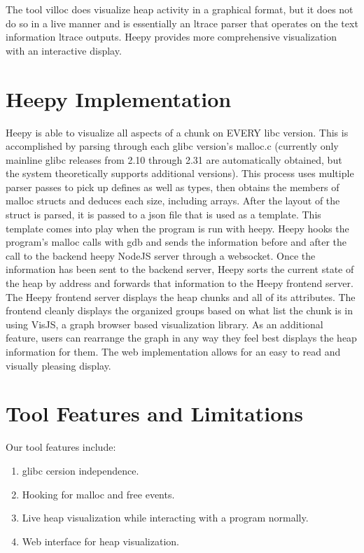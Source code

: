 \documentclass[12pt]{article}
\begin{document}
The tool villoc does visualize heap activity in a graphical format, but it does not do so in a live manner and is essentially an ltrace parser that operates on the text information ltrace outputs. Heepy provides more comprehensive visualization with an interactive display. \\

\section{Heepy Implementation}

Heepy is able to visualize all aspects of a chunk on EVERY libc version. This is accomplished by parsing through each glibc version’s malloc.c (currently only mainline glibc releases from 2.10 through 2.31 are automatically obtained, but the system theoretically supports additional versions). This process uses multiple parser passes to pick up defines as well as types, then obtains the members of malloc structs and deduces each size, including arrays. After the layout of the struct is parsed, it is passed to a json file that is used as a template. This template comes into play when the program is run with heepy. Heepy hooks the program’s malloc calls with gdb and sends the information before and after the call to the backend heepy NodeJS server through a websocket. Once the information has been sent to the backend server, Heepy sorts the current state of the heap by address and forwards that information to the Heepy frontend server. The Heepy frontend server displays the heap chunks and all of its attributes. The frontend cleanly displays the organized groups based on what list the chunk is in using VisJS, a graph browser based visualization library. As an additional feature, users can rearrange the graph in any way they feel best displays the heap information for them. The web implementation allows for an easy to read and visually pleasing display. \\

\section{Tool Features and Limitations}

Our tool features include: \\

\begin{enumerate}
    \item glibc cersion independence.
    \item Hooking for malloc and free events.
    \item Live heap visualization while interacting with a program normally.
    \item Web interface for heap visualization.
\end{enumerate}
\end{document}
